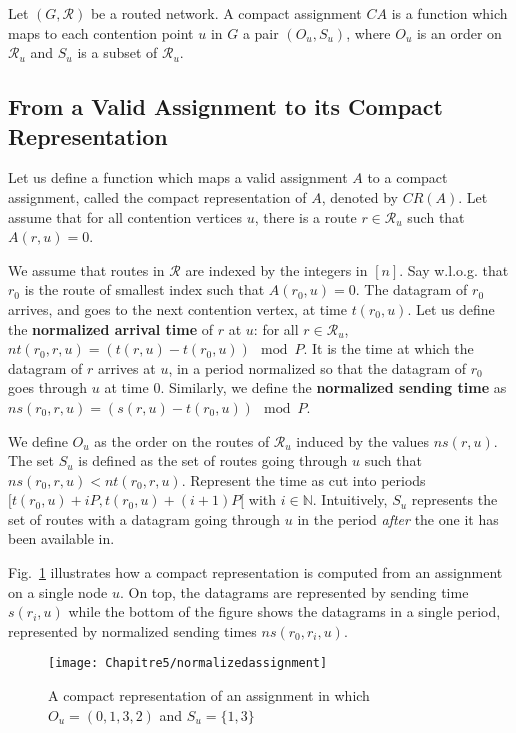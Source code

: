 \begin{definition}
Let $(G, \mathcal{R})$ be a routed network. A compact assignment $CA$ is a function which maps to each contention point $u$ in $G$ a pair $(O_u,S_u)$, where $O_u$ is an order on $\mathcal{R}_u$ and $S_u$ is a subset of $\mathcal{R}_u$.
\label{definition:compact}
\end{definition}

\subsection{From a Valid Assignment to its Compact Representation}

Let us define a function which maps a valid assignment $A$ to a compact assignment, called the compact representation of $A$, denoted by $CR(A)$. Let assume that for all contention vertices $u$, there is a route $r \in \mathcal{R}_u$ such that $A(r,u) = 0$.

We assume that routes in $\mathcal{R}$ are indexed by the integers in $[n]$. Say w.l.o.g. that $r_0$ is the route of smallest index such that $A(r_0,u) = 0$. The datagram of $r_0$ arrives, and goes to the next contention vertex, at time $t(r_0,u)$. Let us define the \textbf{normalized arrival time} of $r$ at $u$: for all $r \in \mathcal{R}_u$, $nt(r_0,r,u) = (t(r,u) - t(r_0,u)) \mod P$. It is the time at which the datagram of $r$ arrives at $u$, in a period normalized so that the datagram of $r_0$ goes through $u$ at time $0$. Similarly, we define the \textbf{normalized sending time} as $ns(r_0,r,u) = (s(r,u) - t(r_0,u)) \mod P$.

We define $O_u$ as the order on the routes of $\mathcal{R}_u$ induced by the values $ns(r,u)$. The set $S_u$ is defined as the set of routes going through $u$ such that $ns(r_0,r,u) < nt(r_0,r,u)$. Represent the time as cut into periods $[t(r_0,u) + iP,t(r_0,u) + (i+1)P [$ with $i \in \mathbb{N}$. Intuitively, $S_u$ represents the set of routes with a datagram going through $u$ in the period \emph{after} the one it has been available in. 

Fig.~\ref{fig:normalizedassignment} illustrates how a compact representation is computed from an assignment on a single node $u$. On top, the datagrams are represented by sending time $s(r_i,u)$ while the bottom of the figure shows the datagrams in a single period, represented by normalized sending times $ns(r_0,r_i,u)$.  
\begin{figure}[!h]
	\centering
	\texttt{[image: Chapitre5/normalizedassignment]}
\caption{A compact representation of an assignment in which $O_u = (0,1,3,2)$ and $S_u = \{1,3\}$ }
\label{fig:normalizedassignment}
\end{figure}


